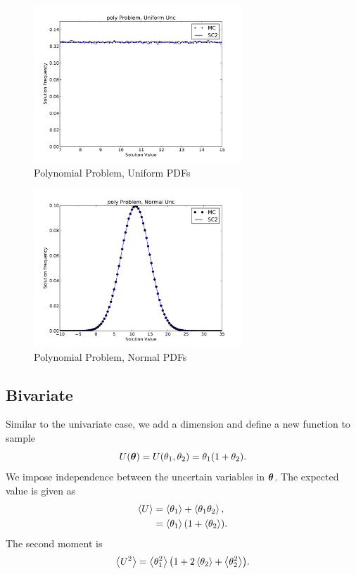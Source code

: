 \begin{figure}[h]
\centering
   \includegraphics[width=0.7\textwidth]{../graphics/poly_uniform_pdfs}
   \caption{Polynomial Problem, Uniform PDFs}
      \label{fig:poly uni}
\end{figure}
\begin{figure}[h]
\centering
   \includegraphics[width=0.7\textwidth]{../graphics/poly_normal_pdfs}
   \caption{Polynomial Problem, Normal PDFs}
      \label{fig:poly norm}
\end{figure}



\subsection{Bivariate}
Similar to the univariate case, we add a dimension and define a new function to sample
\begin{equation}
U(\vb*{\theta})=U(\theta_1,\theta_2)=\theta_1\qty(1+\theta_2).
\end{equation}
We impose independence between the uncertain variables in $\vb*{\theta}$.
The expected value is given as
\begin{align}
\ev{U}&=\ev{\theta_1}+\ev{\theta_1\theta_2},\\
  &= \ev{\theta_1}\qty(1+\ev{\theta_2}).
\end{align}
The second moment is
\begin{align}
\ev{U^2}=\ev{\theta_1^2}\qty(1+2\ev{\theta_2}+\ev{\theta_2^2}).
\end{align}

